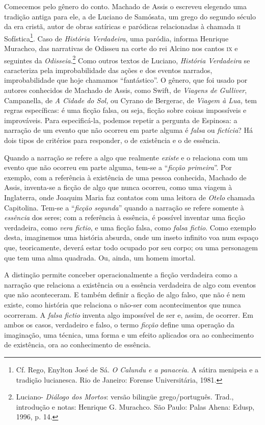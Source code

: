 Comecemos pelo gênero do conto. Machado de Assis o escreveu elegendo uma
tradição antiga para ele, a de Luciano de Samósata, um grego do segundo
século da era cristã, autor de obras satíricas e paródicas relacionadas
à chamada \textsc{ii} Sofística\footnote{Cf. Rego, Enylton José de Sá. \emph{O
  Calundu e a panaceia}. A sátira menipeia e a tradição lucianesca. Rio
  de Janeiro: Forense Universitária, 1981.}. Caso de \emph{História
Verdadeira}, uma paródia, informa Henrique Murachco, das narrativas de
Odisseu na corte do rei Alcino nos cantos \textsc{ix} e seguintes da
\emph{Odisseia}.\footnote{Luciano- \emph{Diálogo dos Mortos}: versão
  bilingüe grego/português. Trad., introdução e notas: Henrique G.
  Murachco. São Paulo: Palas Ahena: Edusp, 1996, p. 14.} Como outros
textos de Luciano, \emph{História Verdadeira} se caracteriza pela
improbabilidade das ações e dos eventos narrados, improbabilidade que
hoje chamamos ``fantástico''. O gênero, que foi usado por autores
conhecidos de Machado de Assis, como Swift, de \emph{Viagens de
Gulliver}, Campanella, de \emph{A Cidade do Sol,} ou Cyrano de Bergerac,
de \emph{Viagem à Lua,} tem regras específicas: é uma ficção falsa, ou
seja, ficção sobre coisas impossíveis e improváveis. Para especificá-la,
podemos repetir a pergunta de Espinosa: a narração de um evento que não
ocorreu em parte alguma é \emph{falsa} ou \emph{fictícia}? Há dois tipos
de critérios para responder, o de existência e o de essência.

Quando a narração se refere a algo que realmente \emph{existe} e o
relaciona com um evento que não ocorreu em parte alguma, tem-se a
``\emph{ficção primeira}''. Por exemplo, com a referência à existência de
uma pessoa conhecida, Machado de Assis, inventa-se a ficção de algo que
nunca ocorreu, como uma viagem à Inglaterra, onde Joaquim Maria faz
contatos com uma leitora de \emph{Otelo} chamada Capitolina. Tem-se a
``\emph{ficção segunda}'' quando a narração se refere somente à
\emph{essência} dos seres; com a referência à essência, é possível
inventar uma ficção verdadeira, como \emph{vera fictio}, e uma ficção
falsa, como \emph{falsa fictio}. Como exemplo desta, imaginemos uma
história absurda, onde um inseto infinito voa num espaço que,
teoricamente, deverá estar todo ocupado por seu corpo; ou uma personagem
que tem uma alma quadrada. Ou, ainda, um homem imortal.

A distinção permite conceber operacionalmente a ficção verdadeira como a
narração que relaciona a existência ou a essência verdadeira de algo com
eventos que não aconteceram. E também definir a ficção de algo falso,
que não é nem existe, como história que relaciona o não-ser com
acontecimentos que nunca ocorreram. A \emph{falsa fictio} inventa algo
impossível de ser e, assim, de ocorrer. Em ambos os casos, verdadeiro e
falso, o termo \emph{ficção} define uma operação da imaginação, uma
técnica, uma forma e um efeito aplicados ora ao conhecimento de
existência, ora ao conhecimento de essência.

